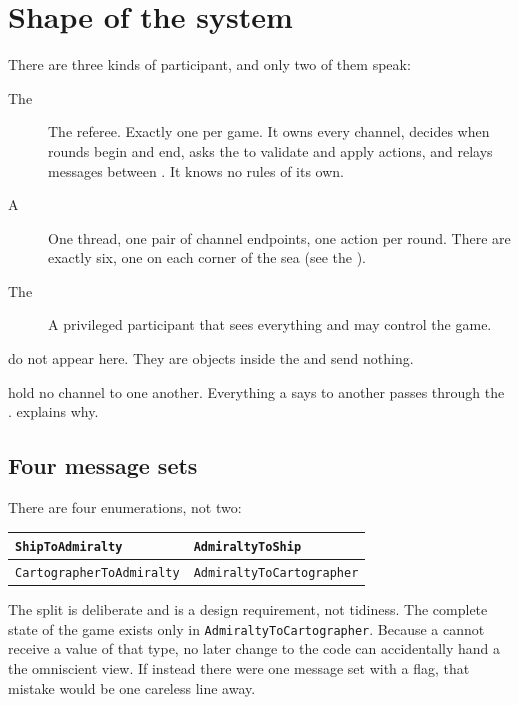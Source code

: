 \documentclass{article}
\begin{document}
\tableofcontents
\newpage

\section{Shape of the system}
\label{proto:shape}

There are three kinds of participant, and only two of them speak:

\begin{description}
    \item[The \admiralty] The referee. Exactly one per game. It owns every channel, decides when
      rounds begin and end, asks the \chart{} to validate and apply actions, and relays messages
      between \ships. It knows no rules of its own.
    \item[A \ship] One thread, one pair of channel endpoints, one action per round. There are
      exactly six, one on each corner of the sea (see the \MD).
    \item[The \cartographer] A privileged participant that sees everything and may control the
      game.
\end{description}

\islands do not appear here. They are objects inside the \chart{} and send nothing.

\ships hold no channel to one another. Everything a \ship{} says to another \ship{} passes through
the \admiralty.  explains why.

\subsection{Four message sets}
\label{proto:foursets}

There are four enumerations, not two:

\begin{center}
\begin{tabular}{|l|l|}
 \hline
 \texttt{ShipToAdmiralty} & \texttt{AdmiraltyToShip} \\
 \hline
 \texttt{CartographerToAdmiralty} & \texttt{AdmiraltyToCartographer} \\
 \hline
\end{tabular}
\end{center}

The split is deliberate and is a design requirement, not tidiness. The complete state of the game
exists only in \texttt{AdmiraltyToCartographer}. Because a \ship{} cannot receive a value of that
type, no later change to the code can accidentally hand a \ship{} the omniscient view. If instead
there were one message set with a flag, that mistake would be one careless line away.
\end{document}

